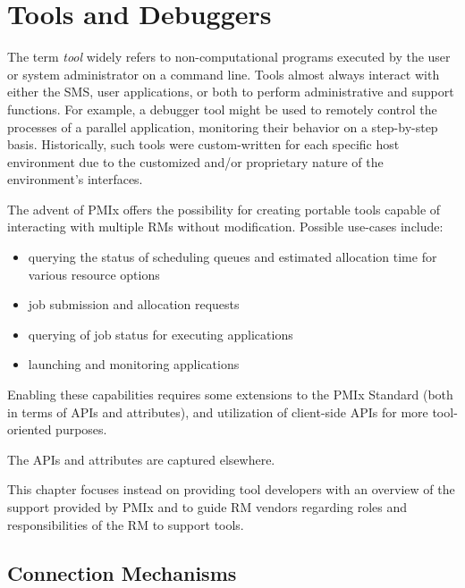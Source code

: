 \chapter{Tools and Debuggers}
\label{chap:api_tools}

The term \textit{tool} widely refers to non-computational programs executed by the user or system administrator on a command line. Tools almost always interact with either the \ac{SMS}, user applications, or both to perform administrative and support functions. For example, a debugger tool might be used to remotely control the processes of a parallel application, monitoring their behavior on a step-by-step basis. Historically, such tools were custom-written for each specific host environment due to the customized and/or proprietary nature of the environment's interfaces.

The advent of \ac{PMIx} offers the possibility for creating portable tools capable of interacting with multiple \acp{RM} without modification. Possible use-cases include:

\begin{itemize}
\item querying the status of scheduling queues and estimated allocation time for various resource options
\item job submission and allocation requests
\item querying of job status for executing applications
\item launching and monitoring applications
\end{itemize}

Enabling these capabilities requires some extensions to the \ac{PMIx} Standard (both in terms of \acp{API} and attributes), and utilization of client-side \acp{API} for more tool-oriented purposes.

The APIs and attributes are captured elsewhere.

This chapter focuses instead on providing tool developers with an overview of the support provided by \ac{PMIx} and to guide \ac{RM} vendors regarding roles and responsibilities of the \ac{RM} to support tools.

\section{Connection Mechanisms}
\label{chap:api_tools:cnct}

